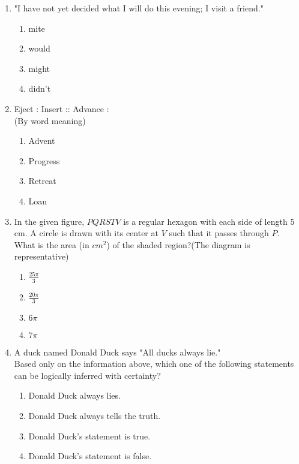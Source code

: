 \documentclass[journal,12pt,onecolumn]{IEEEtran}
\theoremstyle{remark}
\begin{document}
\begin{enumerate}

    \item "I have not yet decided what I will do this evening; I {\underline{\hspace{2cm}}}visit a friend."
    \begin{enumerate}
        \item mite
        \item would
        \item might
        \item didn't
    \end{enumerate}

    \item Eject : Insert :: Advance :\\
    (By word meaning)
    
    \begin{enumerate}
        \item Advent
        \item Progress
        \item Retreat
        \item Loan
    \end{enumerate}

    \item In the given figure, $PQRSTV$ is a regular hexagon with each side of length $5$ cm. A circle is drawn with its center at $V$ such that it passes through $P$. What is the area (in $cm^2$) of the shaded region?(The diagram is representative)

    \begin{enumerate}
        \item $\frac{25\pi}{3}$
        \item $\frac{20\pi}{3}$
        \item $6\pi$
        \item $7\pi$
    \end{enumerate}

    \begin{figure}[H]
        \centering
    \end{figure}


    \item A duck named Donald Duck says "All ducks always lie." \\
    Based only on the information above, which one of the following statements can be logically inferred with certainty?
    \begin{enumerate}
        \item Donald Duck always lies.
        \item Donald Duck always tells the truth.
        \item Donald Duck's statement is true.
        \item Donald Duck's statement is false.
    \end{enumerate}


\end{enumerate}
\end{document}
